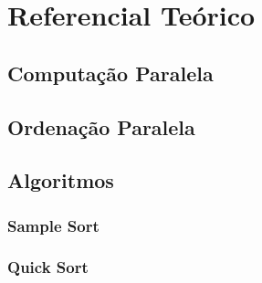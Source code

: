 \chapter{Referencial Teórico}

\section{Computação Paralela}

\section{Ordenação Paralela}

\section{Algoritmos}
\subsection{Sample Sort}
\subsection{Quick Sort}

